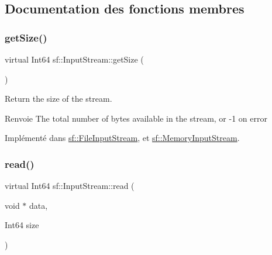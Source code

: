 \subsection{Documentation des fonctions membres}
\mbox{\label{classsf_1_1InputStream_a311eaaaa65d636728e5153b574b72d5d}} 
\subsubsection{\texorpdfstring{get\+Size()}{getSize()}}
{\footnotesize\ttfamily virtual Int64 sf\+::\+Input\+Stream\+::get\+Size (\begin{DoxyParamCaption}{ }\end{DoxyParamCaption})\hspace{0.3cm}{\ttfamily [pure virtual]}}



Return the size of the stream. 

\begin{DoxyReturn}{Renvoie}
The total number of bytes available in the stream, or -\/1 on error 
\end{DoxyReturn}


Implémenté dans \hyperlink{classsf_1_1FileInputStream_aabdcaa315e088e008eeb9711ecc796e8}{sf\+::\+File\+Input\+Stream}, et \hyperlink{classsf_1_1MemoryInputStream_a6ade3ca45de361ffa0a718595f0b6763}{sf\+::\+Memory\+Input\+Stream}.

\mbox{\label{classsf_1_1InputStream_a8dd89c74c1acb693203f50e750c6ae53}} 
\subsubsection{\texorpdfstring{read()}{read()}}
{\footnotesize\ttfamily virtual Int64 sf\+::\+Input\+Stream\+::read (\begin{DoxyParamCaption}\item[{void $\ast$}]{data,  }\item[{Int64}]{size }\end{DoxyParamCaption})\hspace{0.3cm}{\ttfamily [pure virtual]}}



